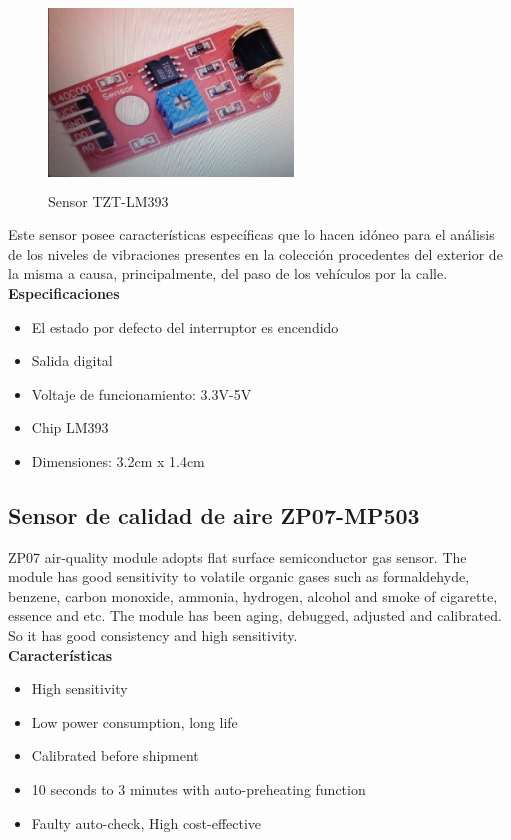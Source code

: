 \begin{figure}[H]
    \centering
    \includegraphics[width=6.5cm, height=5cm]{imagenes/sensor TZT.jpg}
    \caption{Sensor TZT-LM393}
    \label{imag:TZT}
\end{figure}

Este sensor posee características específicas que lo hacen idóneo para el análisis de los niveles de vibraciones presentes en la colección procedentes del exterior de la misma a causa, principalmente, del paso de los vehículos por la calle.\\

\textbf{Especificaciones}
\begin{itemize}
    \item El estado por defecto del interruptor es encendido
    \item Salida digital
    \item Voltaje de funcionamiento: 3.3V-5V
    \item Chip LM393
    \item Dimensiones: 3.2cm x 1.4cm
\end{itemize}

\subsection{Sensor de calidad de aire ZP07-MP503}

ZP07 air-quality module adopts flat surface semiconductor gas sensor. The module has good sensitivity to volatile organic gases such as formaldehyde, benzene, carbon
monoxide, ammonia, hydrogen, alcohol and smoke of cigarette, essence and etc. The module has been aging, debugged, adjusted and calibrated. So it has good consistency and high sensitivity.\\

\textbf{Características}
\begin{itemize}
    \item High sensitivity
    \item Low power consumption, long life
    \item Calibrated before shipment
    \item 10 seconds to 3 minutes with auto-preheating function
    \item Faulty auto-check, High cost-effective
\end{itemize}

